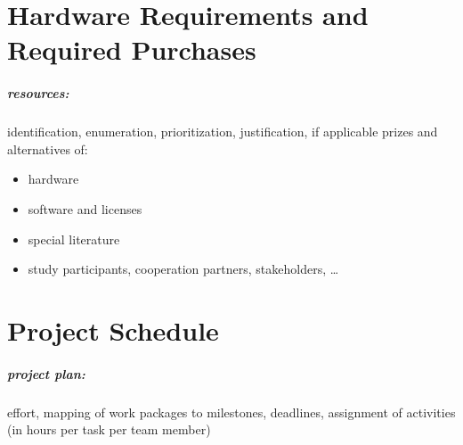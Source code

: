 \chapter{Hardware Requirements and Required Purchases}
\label{chp:hardware-purchases}


\begin{shaded}
\paragraph{resources:} identification, enumeration, prioritization, justification, if applicable prizes and alternatives of:

\begin{itemize}[noitemsep, nolistsep]
	\item hardware
	\item software and licenses
	\item special literature
	\item study participants, cooperation partners, stakeholders, \dots
\end{itemize}

\end{shaded}

\lipsum[27-29]


\chapter{Project Schedule}
\label{chp:schedule}


\begin{shaded}
\paragraph{project plan:} effort, mapping of work packages to milestones, deadlines, assignment of activities (in hours per task per team member)
\end{shaded}

\lipsum[30]

